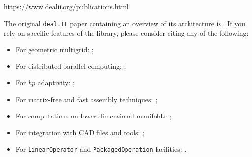 \documentclass{ansarticle-preprint}
\newcommand{\specialword}[1]{\texttt{#1}}
\newcommand{\dealii}{{\specialword{deal.II}}}
\begin{document}
\bigskip

\begin{center}
 \url{https://www.dealii.org/publications.html}
\end{center}

\bigskip


The original \texttt{\dealii{}} paper containing an overview of its
architecture is \cite{BangerthHartmannKanschat2007}. If you rely on specific
features of the library, please consider citing any of the following:
\begin{itemize}
 \item For geometric multigrid: \cite{Kanschat2004,JanssenKanschat2011};
 \item For distributed parallel computing: \cite{BangerthBursteddeHeisterKronbichler11};
 \item For $hp$ adaptivity: \cite{BangerthKayserHerold2007};
 \item For matrix-free and fast assembly techniques:
   \cite{KronbichlerKormann2012};
 \item For computations on lower-dimensional manifolds:
   \cite{DeSimoneHeltaiManigrasso2009};
 \item For integration with CAD files and tools:
   \cite{HeltaiMola2015};
 \item For \texttt{LinearOperator} and \texttt{PackagedOperation} facilities:
   \cite{MaierBardelloniHeltai-2015-a}.
\end{itemize}
\end{document}
